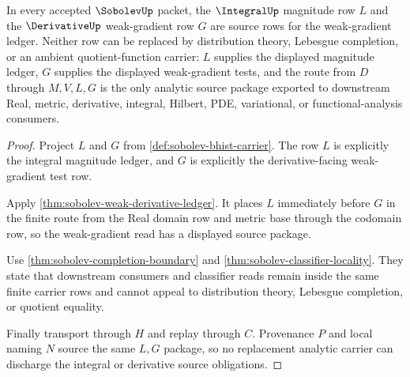 \begin{theorem}
\label{thm:sobolev-integral-derivative-source-package}
In every accepted $\SobolevUp$ packet, the $\IntegralUp$ magnitude row $L$ and the $\DerivativeUp$ weak-gradient row $G$ are source rows for the weak-gradient ledger. Neither row can be replaced by distribution theory, Lebesgue completion, or an ambient quotient-function carrier: $L$ supplies the displayed magnitude ledger, $G$ supplies the displayed weak-gradient tests, and the route from $D$ through $M,V,L,G$ is the only analytic source package exported to downstream Real, metric, derivative, integral, Hilbert, PDE, variational, or functional-analysis consumers.
\end{theorem}
\begin{proof}
Project $L$ and $G$ from \autoref{def:sobolev-bhist-carrier}. The row $L$ is explicitly the integral magnitude ledger, and $G$ is explicitly the derivative-facing weak-gradient test row.

Apply \autoref{thm:sobolev-weak-derivative-ledger}. It places $L$ immediately before $G$ in the finite route from the Real domain row and metric base through the codomain row, so the weak-gradient read has a displayed source package.

Use \autoref{thm:sobolev-completion-boundary} and \autoref{thm:sobolev-classifier-locality}. They state that downstream consumers and classifier reads remain inside the same finite carrier rows and cannot appeal to distribution theory, Lebesgue completion, or quotient equality.

Finally transport through $H$ and replay through $C$. Provenance $P$ and local naming $N$ source the same $L,G$ package, so no replacement analytic carrier can discharge the integral or derivative source obligations.
\end{proof}

